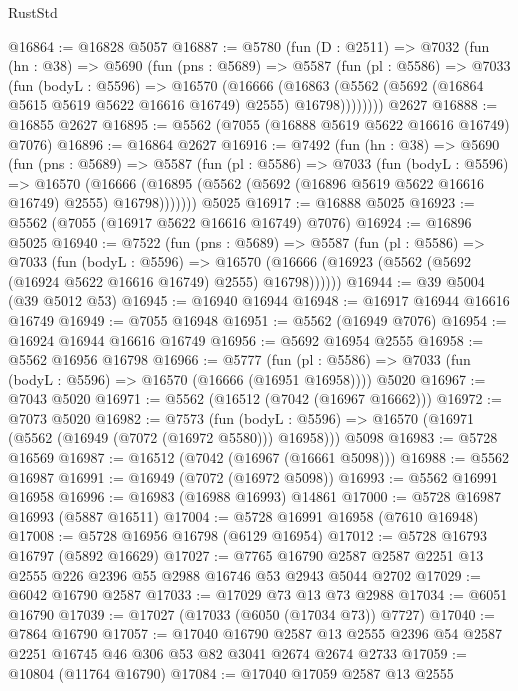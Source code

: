 \begin{lexlean}{RustStd}
\begin{coremodule}
@16864 := @16828 @5057
@16887 := @5780
    (fun (D : @2511) =>
    @7032
      (fun (hn : @38) =>
      @5690
        (fun (pns : @5689) =>
        @5587
          (fun (pl : @5586) =>
          @7033
            (fun (bodyL : @5596) =>
            @16570
              (@16666
                (@16863 (@5562 (@5692 (@16864 @5615 @5619 @5622 @16616 @16749) @2555) @16798))))))))
    @2627
@16888 := @16855 @2627
@16895 := @5562 (@7055 (@16888 @5619 @5622 @16616 @16749) @7076)
@16896 := @16864 @2627
@16916 := @7492
    (fun (hn : @38) =>
    @5690
      (fun (pns : @5689) =>
      @5587
        (fun (pl : @5586) =>
        @7033
          (fun (bodyL : @5596) =>
          @16570
            (@16666 (@16895 (@5562 (@5692 (@16896 @5619 @5622 @16616 @16749) @2555) @16798)))))))
    @5025
@16917 := @16888 @5025
@16923 := @5562 (@7055 (@16917 @5622 @16616 @16749) @7076)
@16924 := @16896 @5025
@16940 := @7522
    (fun (pns : @5689) =>
    @5587
      (fun (pl : @5586) =>
      @7033
        (fun (bodyL : @5596) =>
        @16570 (@16666 (@16923 (@5562 (@5692 (@16924 @5622 @16616 @16749) @2555) @16798))))))
@16944 := @39 @5004 (@39 @5012 @53)
@16945 := @16940 @16944
@16948 := @16917 @16944 @16616 @16749
@16949 := @7055 @16948
@16951 := @5562 (@16949 @7076)
@16954 := @16924 @16944 @16616 @16749
@16956 := @5692 @16954 @2555
@16958 := @5562 @16956 @16798
@16966 := @5777
    (fun (pl : @5586) => @7033 (fun (bodyL : @5596) => @16570 (@16666 (@16951 @16958))))
    @5020
@16967 := @7043 @5020
@16971 := @5562 (@16512 (@7042 (@16967 @16662)))
@16972 := @7073 @5020
@16982 := @7573
    (fun (bodyL : @5596) => @16570 (@16971 (@5562 (@16949 (@7072 (@16972 @5580))) @16958)))
    @5098
@16983 := @5728 @16569
@16987 := @16512 (@7042 (@16967 (@16661 @5098)))
@16988 := @5562 @16987
@16991 := @16949 (@7072 (@16972 @5098))
@16993 := @5562 @16991 @16958
@16996 := @16983 (@16988 @16993) @14861
@17000 := @5728 @16987 @16993 (@5887 @16511)
@17004 := @5728 @16991 @16958 (@7610 @16948)
@17008 := @5728 @16956 @16798 (@6129 @16954)
@17012 := @5728 @16793 @16797 (@5892 @16629)
@17027 := @7765 @16790 @2587 @2587 @2251 @13 @2555 @226 @2396 @55 @2988 @16746 @53 @2943 @5044 @2702
@17029 := @6042 @16790 @2587
@17033 := @17029 @73 @13 @73 @2988
@17034 := @6051 @16790
@17039 := @17027 (@17033 (@6050 (@17034 @73)) @7727)
@17040 := @7864 @16790
@17057 := @17040
    @16790
    @2587
    @13
    @2555
    @2396
    @54
    @2587
    @2251
    @16745
    @46
    @306
    @53
    @82
    @3041
    @2674
    @2674
    @2733
@17059 := @10804 (@11764 @16790)
@17084 := @17040
    @17059
    @2587
    @13
    @2555

\end{coremodule}
\end{lexlean}
